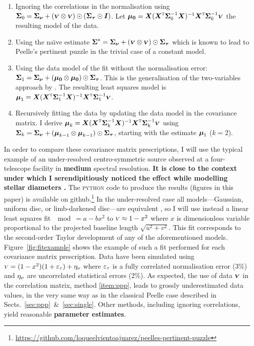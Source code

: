 \documentclass{pasa}
\def\correction#1{{\bfseries #1}}
\begin{document}
\begin{enumerate}
    \item Ignoring the correlations in the normalisation using $\boldsymbol{\Sigma}_0 = \boldsymbol{\Sigma_\nu} + (\boldsymbol{{\scriptstyle V}}\otimes\boldsymbol{{\scriptstyle V}})\odot(\boldsymbol{\Sigma_\tau}\odot\boldsymbol{I})$. Let $\boldsymbol{\mu_0} = \boldsymbol{X}({\boldsymbol{X}}^\text{\textsc{t}}\boldsymbol{\Sigma}_0^{-1}\boldsymbol{X})^{-1}{\boldsymbol{X}}^\text{\textsc{t}}\boldsymbol{\Sigma}_0^{-1}\boldsymbol{{\scriptstyle V}}$ the resulting model of the data.\label{item:nocorr} 
    \item Using the na\"\i{}ve estimate $\boldsymbol{\Sigma}^\star = \boldsymbol{\Sigma_\nu} + (\boldsymbol{{\scriptstyle V}}\otimes\boldsymbol{{\scriptstyle V}})\odot\boldsymbol{\Sigma_\tau}$ which is known to lead to Peelle's pertinent puzzle in the trivial case of a constant model.\label{item:ppp}
    \item Using the data model of the fit without the normalisation error: $\boldsymbol{\Sigma}_1 = \boldsymbol{\Sigma_\nu} + (\boldsymbol{\mu_0}\otimes\boldsymbol{\mu_0})\odot\boldsymbol{\Sigma_\tau}$. This is the generalisation of the two-variables approach by \citet{NEU14}. The resulting least squares model is $\boldsymbol{\mu}_{1} = \boldsymbol{X}({\boldsymbol{X}}^\text{\textsc{t}}\boldsymbol{\Sigma}_1^{-1}\boldsymbol{X})^{-1}{\boldsymbol{X}}^\text{\textsc{t}}\boldsymbol{\Sigma}_1^{-1}\boldsymbol{{\scriptstyle V}}$.\label{item:fit}
    \item Recursively fitting the data by updating the data model in the covariance matrix. I derive $\boldsymbol{\mu}_{k} = \boldsymbol{X}({\boldsymbol{X}}^\text{\textsc{t}}\boldsymbol{\Sigma}_k^{-1}\boldsymbol{X})^{-1}{\boldsymbol{X}}^\text{\textsc{t}}\boldsymbol{\Sigma}_k^{-1}\boldsymbol{{\scriptstyle V}}$ using $\boldsymbol{\Sigma}_{k} = \boldsymbol{\Sigma_\nu} + (\boldsymbol{\mu}_{k-1}\otimes\boldsymbol{\mu}_{k-1})\odot\boldsymbol{\Sigma_\tau}$, starting with the estimate $\boldsymbol{\mu}_{1}$ ($k = 2$).\label{item:recfit}
\end{enumerate}

In order to compare these covariance matrix prescriptions, I will use the typical example of an under-resolved centro-symmetric source observed at a four-telescope facility in \correction{medium} spectral resolution. \correction{It is close to the context under which I serendipitiously noticed the effect while modelling stellar diameters \citep[see][]{LAC19}.} The \textsc{python} code to produce the results (figures in this paper) is available on github.\footnote{\url{https://github.com/loqueelvientoajuarez/peelles-pertinent-puzzle}} In the under-resolved case all models---Gaussian, uniform disc, or limb-darkened disc---are equivalent \citep{LAC03}, so I will use instead a linear least squares fit $\mod = a - bx^2$ to ${\scriptstyle V} \approx 1 - x^2$ where $x$ is dimensionless variable proportional to the projected baseline length $\sqrt{u^2+v^2}$. This fit corresponds to the second-order Taylor development of any of the aforementioned models.  Figure~\ref{fig:fitexample} shows the example of such a fit performed for each covariance matrix prescription.  Data have been simulated using ${\scriptstyle V} = (1-x^2)(1 + \varepsilon_\tau) + \eta_\nu$ where $\varepsilon_\tau$ is a fully correlated normalisation error (3\%) and $\eta_\nu$ are uncorrelated statistical errors (2\%). As expected, the use of data $\boldsymbol{{\scriptstyle V}}$ in the correlation matrix, method \ref{item:ppp}, leads to grossly underestimated data values, in the very same way as in the classical Peelle case described in Sects.~\ref{sec:ppp}~\&~\ref{sec:single}.  Other methods, including ignoring correlations, yield reasonable \correction{parameter estimates}.
\end{document}
